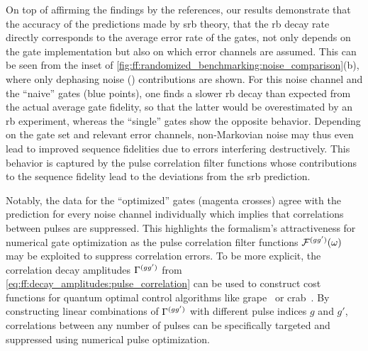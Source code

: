 On top of affirming the findings by the references, our results demonstrate that the accuracy of the predictions made by \gls{srb} theory, \ie that the \gls{rb} decay rate directly corresponds to the average error rate of the gates, not only depends on the gate implementation but also on which error channels are assumed.
This can be seen from the inset of \cref{fig:ff:randomized_benchmarking:noise_comparison}(b), where only dephasing noise (\sz) contributions are shown.
For this noise channel and the \enquote{naive} gates (blue points), one finds a slower \gls{rb} decay than expected from the actual average gate fidelity, so that the latter would be overestimated by an \gls{rb} experiment, whereas the \enquote{single} gates show the opposite behavior.
Depending on the gate set and relevant error channels, non-Markovian noise may thus even lead to improved sequence fidelities due to errors interfering destructively.
This behavior is captured by the pulse correlation filter functions whose contributions to the sequence fidelity lead to the deviations from the \gls{srb} prediction.

Notably, the data for the \enquote{optimized} gates (magenta crosses) agree with the prediction for every noise channel individually which implies that correlations between pulses are suppressed.
This highlights the formalism's attractiveness for numerical gate optimization as the pulse correlation filter functions $\mathcal{F}^{(gg^\prime)}(\omega)$ may be exploited to suppress correlation errors.
To be more explicit, the correlation decay amplitudes $\Gamma^{(gg^\prime)}$ from \cref{eq:ff:decay_amplitudes:pulse_correlation} can be used to construct cost functions for quantum optimal control algorithms like \gls{grape}~\cite{Khaneja2005,Schulte-Herbruggen2005} or \gls{crab}~\cite{Caneva2011}.
By constructing linear combinations of $\Gamma^{(gg')}$ with different pulse indices $g$ and $g'$, correlations between any number of pulses can be specifically targeted and suppressed using numerical pulse optimization.


